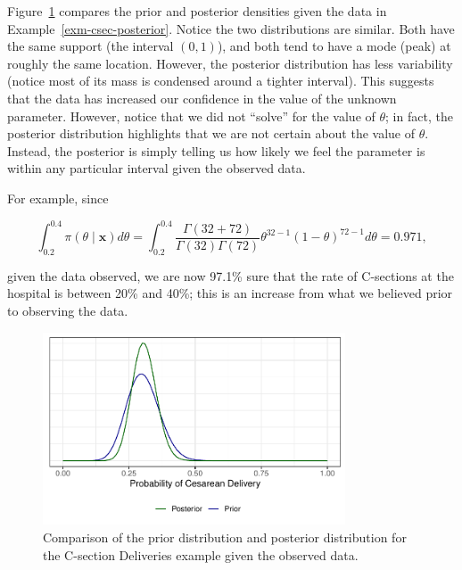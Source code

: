 \documentclass[
  letterpaper,
  DIV=11,
  numbers=noendperiod]{scrreprt}
\theoremstyle{definition}
\theoremstyle{plain}
\theoremstyle{definition}
\theoremstyle{remark}
\begin{document}
Figure~\ref{fig-csec-comparison} compares the prior and posterior
densities given the data in Example~\ref{exm-csec-posterior}. Notice the
two distributions are similar. Both have the same support (the interval
\((0, 1)\)), and both tend to have a mode (peak) at roughly the same
location. However, the posterior distribution has less variability
(notice most of its mass is condensed around a tighter interval). This
suggests that the data has increased our confidence in the value of the
unknown parameter. However, notice that we did not ``solve'' for the
value of \(\theta\); in fact, the posterior distribution highlights that
we are not certain about the value of \(\theta\). Instead, the posterior
is simply telling us how likely we feel the parameter is within any
particular interval given the observed data.

For example, since

\[\int_{0.2}^{0.4} \pi(\theta \mid \mathbf{x}) d\theta = \int_{0.2}^{0.4} \frac{\Gamma(32 + 72)}{\Gamma(32)\Gamma(72)} \theta^{32 - 1} (1 - \theta)^{72 - 1} d\theta = 0.971,\]

given the data observed, we are now 97.1\% sure that the rate of
C-sections at the hospital is between 20\% and 40\%; this is an increase
from what we believed prior to observing the data.

\begin{figure}

{\centering \includegraphics[width=0.8\textwidth,height=\textheight]{./images/fig-csec-comparison-1.pdf}

}

\caption{\label{fig-csec-comparison}Comparison of the prior distribution
and posterior distribution for the C-section Deliveries example given
the observed data.}

\end{figure}
\end{document}
